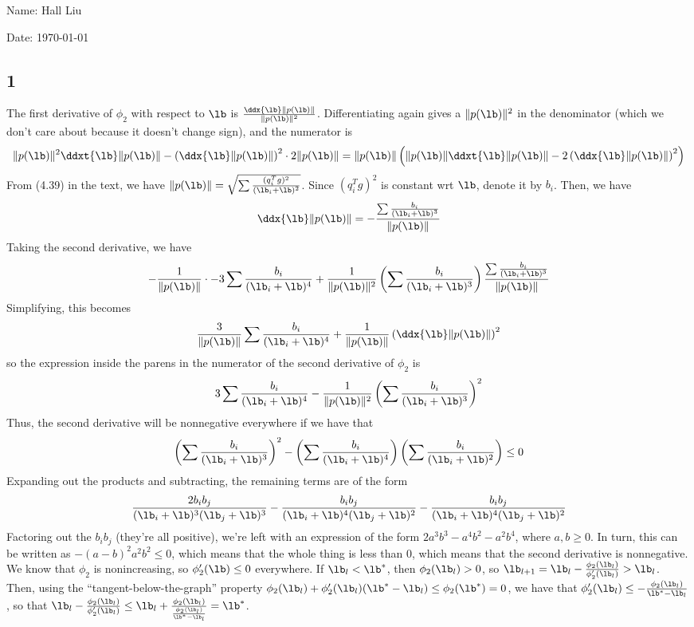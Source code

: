 \documentclass{article}
\begin{document}
Name: Hall Liu

Date: \today 
\vspace{1.5cm}

\subsection*{1}
The first derivative of $\phi_2$ with respect to $\lb$ is $\frac{\ddx{\lb}\|p(\lb)\|}{\|p(\lb)\|^2}$. Differentiating again gives a $\|p(\lb)\|^2$ in the denominator (which we don't care about because it doesn't change sign), and the numerator is
\[ \|p(\lb)\|^2\ddxt{\lb}\|p(\lb)\|-\left(\ddx{\lb}\|p(\lb)\|\right)^2\cdot2\|p(\lb)\|=\|p(\lb)\|\left(\|p(\lb)\|\ddxt{\lb}\|p(\lb)\|-2\left(\ddx{\lb}\|p(\lb)\|\right)^2\right)\]
From (4.39) in the text, we have $\|p(\lb)\|=\sqrt{\sum\frac{(q_i^Tg)^2}{(\lb_i+\lb)^2}}$. Since $(q_i^Tg)^2$ is constant wrt $\lb$, denote it by $b_i$. Then, we have
\[\ddx{\lb}\|p(\lb)\|=-\frac{\sum\frac{b_i}{(\lb_i+\lb)^3}}{\|p(\lb)\|}\]
Taking the second derivative, we have
\[-\frac{1}{\|p(\lb)\|}\cdot-3\sum\frac{b_i}{(\lb_i+\lb)^4}+\frac{1}{\|p(\lb)\|^2}\left(\sum\frac{b_i}{(\lb_i+\lb)^3}\right)\frac{\sum\frac{b_i}{(\lb_i+\lb)^3}}{\|p(\lb)\|}\]
Simplifying, this becomes
\[\frac{3}{\|p(\lb)\|}\sum\frac{b_i}{(\lb_i+\lb)^4}+\frac{1}{\|p(\lb)\|}\left(\ddx{\lb}\|p(\lb)\|\right)^2\]
so the expression inside the parens in the numerator of the second derivative of $\phi_2$ is
\[3\sum\frac{b_i}{(\lb_i+\lb)^4}-\frac{1}{\|p(\lb)\|^2}\left(\sum\frac{b_i}{(\lb_i+\lb)^3}\right)^2\]
Thus, the second derivative will be nonnegative everywhere if we have that 
\[\left(\sum\frac{b_i}{(\lb_i+\lb)^3}\right)^2-\left(\sum\frac{b_i}{(\lb_i+\lb)^4}\right)\left(\sum\frac{b_i}{(\lb_i+\lb)^2}\right)\leq0\]
Expanding out the products and subtracting, the remaining terms are of the form 
\[\frac{2b_ib_j}{(\lb_i+\lb)^3(\lb_j+\lb)^3}-\frac{b_ib_j}{(\lb_i+\lb)^4(\lb_j+\lb)^2}-\frac{b_ib_j}{(\lb_i+\lb)^4(\lb_j+\lb)^2}\]
Factoring out the $b_ib_j$ (they're all positive), we're left with an expression of the form $2a^3b^3-a^4b^2-a^2b^4$, where $a,b\geq0$. In turn, this can be written as $-(a-b)^2a^2b^2\leq0$, which means that the whole thing is less than $0$, which means that the second derivative is nonnegative.
We know that $\phi_2$ is nonincreasing, so $\phi_2'(\lb)\leq0$ everywhere. If $\lb_{l}<\lb^*$, then $\phi_2(\lb_l)>0$, so $\lb_{l+1}=\lb_l-\frac{\phi_2(\lb_l)}{\phi_2'(\lb_l)}>\lb_l$. Then, using the ``tangent-below-the-graph'' property $\phi_2(\lb_l)+\phi_2'(\lb_l)(\lb^*-\lb_l)\leq\phi_2(\lb^*)=0$, we have that $\phi_2'(\lb_l)\leq-\frac{\phi_2(\lb_l)}{\lb^*-\lb_l}$, so that $\lb_l-\frac{\phi_2(\lb_l)}{\phi_2'(\lb_l)}\leq\lb_l+\frac{\phi_2(\lb_l)}{\frac{\phi_2(\lb_l)}{\lb^*-\lb_l}}=\lb^*$.
\end{document}
